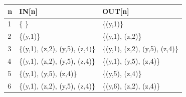 \begin{frame}[fragile, t]
	\begin{columns}[T]
		\begin{column}[T]{.3\textwidth}
			\vspace{0pt}
			
		\end{column}
		\begin{column}[T]{.7\textwidth}
			\vspace{0pt}    
			\begin{scriptsize}
				\begin{table}[]
					\begin{tabular}{|l|l|l|}
						\hline
						n  & IN{[}n{]} & OUT{[}n{]} \\ \hline
						1  & \pause \{ \}                          & \pause \{(y,1)\} \\ \hline
						2  & \pause \{(y,1)\}                      & \pause \{(y,1), (z,2)\} \\ \hline
						3  & \pause \{(y,1), (z,2), (y,5), (z,4)\} & \pause \{(y,1), (z,2), (y,5), (z,4)\} \\ \hline
						4  & \pause \{(y,1), (z,2), (y,5), (z,4)\} & \pause \{(y,1), (y,5), (z,4)\} \\ \hline
						5  & \pause \{(y,1), (y,5), (z,4)\}        & \pause \{(y,5), (z,4)\} \\ \hline
						6  & \pause \{(y,1), (z,2), (y,5), (z,4)\} & \pause \{(y,6), (z,2), (z,4)\} \\ \hline
					\end{tabular}
				\end{table}   
			\end{scriptsize}
		\end{column}
		
	\end{columns}
	
\end{frame}   



